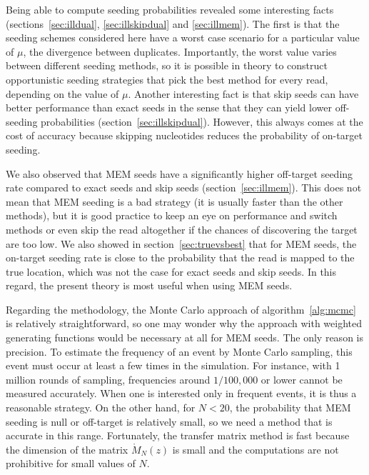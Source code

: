 \documentclass{article}
\begin{document}
Being able to compute seeding probabilities revealed some interesting
facts (sections~\ref{sec:illdual}, \ref{sec:illskipdual} and
\ref{sec:illmem}). The first is that the seeding schemes considered here
have a worst case scenario for a particular value of $\mu$, the divergence
between duplicates. Importantly, the worst value varies between different
seeding methods, so it is possible in theory to construct opportunistic
seeding strategies that pick the best method for every read, depending on
the value of $\mu$. Another interesting fact is that skip seeds can have
better performance than exact seeds in the sense that they can yield lower
off-seeding probabilities (section~\ref{sec:illskipdual}). However, this
always comes at the cost of accuracy because skipping nucleotides reduces
the probability of on-target seeding.

We also observed that MEM seeds have a significantly higher off-target
seeding rate compared to exact seeds and skip seeds
(section~\ref{sec:illmem}). This does not mean that MEM seeding is a bad
strategy (it is usually faster than the other methods), but it is good
practice to keep an eye on performance and switch methods or even skip the
read altogether if the chances of discovering the target are too low. We
also showed in section~\ref{sec:truevsbest} that for MEM seeds, the
on-target seeding rate is close to the probability that the read is mapped
to the true location, which was not the case for exact seeds and skip
seeds. In this regard, the present theory is most useful when using MEM
seeds.

Regarding the methodology, the Monte Carlo approach of
algorithm~\ref{alg:mcmc} is relatively straightforward, so one may wonder
why the approach with weighted generating functions would be necessary at
all for MEM seeds. The only reason is precision. To estimate the frequency
of an event by Monte Carlo sampling, this event must occur at least a few
times in the simulation. For instance, with 1 million rounds of sampling,
frequencies around $1/100,000$ or lower cannot be measured accurately.
When one is interested only in frequent events, it is thus a reasonable
strategy. On the other hand, for $N < 20$, the probability that MEM
seeding is null or off-target is relatively small, so we need a method
that is accurate in this range. Fortunately, the transfer matrix method is
fast because the dimension of the matrix $\mathring{M}_N(z)$ is small and
the computations are not prohibitive for small values of $N$.
\end{document}
